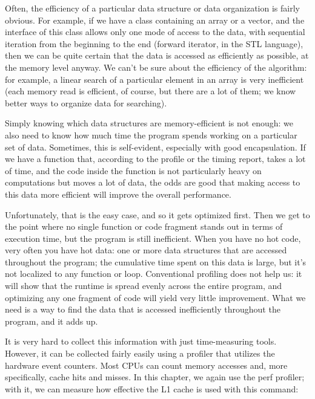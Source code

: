 
Often, the efficiency of a particular data structure or data organization is fairly obvious. For example, if we have a class containing an array or a vector, and the interface of this class allows only one mode of access to the data, with sequential iteration from the beginning to the end (forward iterator, in the STL language), then we can be quite certain that the data is accessed as efficiently as possible, at the memory level anyway. We can't be sure about the efficiency of the algorithm: for example, a linear search of a particular element in an array is very inefficient (each memory read is efficient, of course, but there are a lot of them; we know better ways to organize data for searching).

Simply knowing which data structures are memory-efficient is not enough: we also need to know how much time the program spends working on a particular set of data. Sometimes, this is self-evident, especially with good encapsulation. If we have a function that, according to the profile or the timing report, takes a lot of time, and the code inside the function is not particularly heavy on computations but moves a lot of data, the odds are good that making access to this data more efficient will improve the overall performance.

Unfortunately, that is the easy case, and so it gets optimized first. Then we get to the point where no single function or code fragment stands out in terms of execution time, but the program is still inefficient. When you have no hot code, very often you have hot data: one or more data structures that are accessed throughout the program; the cumulative time spent on this data is large, but it's not localized to any function or loop. Conventional profiling does not help us: it will show that the runtime is spread evenly across the entire program, and optimizing any one fragment of code will yield very little improvement. What we need is a way to find the data that is accessed inefficiently throughout the program, and it adds up.

It is very hard to collect this information with just time-measuring tools. However, it can be collected fairly easily using a profiler that utilizes the hardware event counters. Most CPUs can count memory accesses and, more specifically, cache hits and misses. In this chapter, we again use the perf profiler; with it, we can measure how effective the L1 cache is used with this command:

